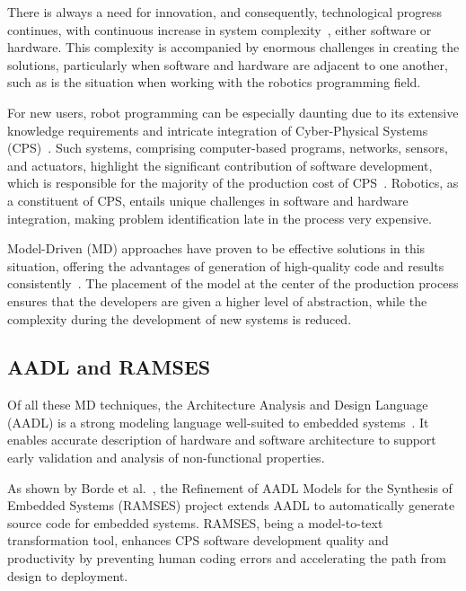 There is always a need for innovation, and consequently, technological progress continues, with continuous increase in system complexity~\cite{lee2008}, either software or hardware. This complexity is accompanied by enormous challenges in creating the solutions, particularly when software and hardware are adjacent to one another, such as is the situation when working with the robotics programming field. 
\par
For new users, robot programming can be especially daunting due to its extensive knowledge requirements and intricate integration of Cyber-Physical Systems (CPS)~\cite{Khatib_Siciliano_2016}. Such systems, comprising computer-based programs, networks, sensors, and actuators, highlight the significant contribution of software development, which is responsible for the majority of the production cost of CPS~\cite{Rajkumar_Ragunathan_Lee_2010}. Robotics, as a constituent of CPS, entails unique challenges in software and hardware integration, making problem identification late in the process very expensive.
\par
Model-Driven (MD) approaches have proven to be effective solutions in this situation, offering the advantages of generation of high-quality code and results consistently~\cite{Schmidt_DC_2006}. The placement of the model at the center of the production process ensures that the developers are given a higher level of abstraction, while the complexity during the development of new systems is reduced.

\subsection{AADL and RAMSES}

Of all these MD techniques, the Architecture Analysis and Design Language (AADL) is a strong modeling language well-suited to embedded systems~\cite{Feiler_Lewis_Vestal_2006}. It enables accurate description of hardware and software architecture to support early validation and analysis of non-functional properties.
\par
As shown by Borde et al.~\cite{Borde_Rahmoun_Cadoret_Pautet_Singhoff_Dissaux_2014}, the Refinement of AADL Models for the Synthesis of Embedded Systems (RAMSES) project extends AADL to automatically generate source code for embedded systems. RAMSES, being a model-to-text transformation tool, enhances CPS software development quality and productivity by preventing human coding errors and accelerating the path from design to deployment.

